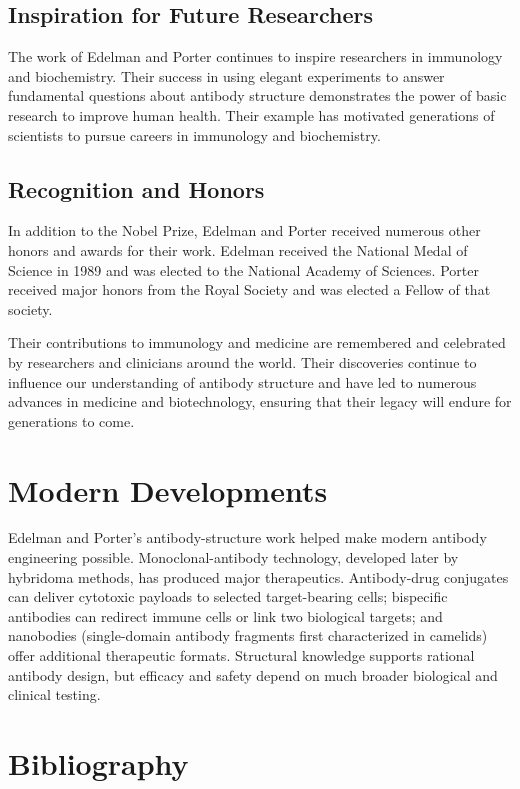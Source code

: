 \subsection{Inspiration for Future Researchers}

The work of Edelman and Porter continues to inspire researchers in immunology and biochemistry. Their success in using elegant experiments to answer fundamental questions about antibody structure demonstrates the power of basic research to improve human health. Their example has motivated generations of scientists to pursue careers in immunology and biochemistry.

\subsection{Recognition and Honors}

In addition to the Nobel Prize, Edelman and Porter received numerous other honors and awards for their work. Edelman received the National Medal of Science in 1989 and was elected to the National Academy of Sciences. Porter received major honors from the Royal Society and was elected a Fellow of that society.

Their contributions to immunology and medicine are remembered and celebrated by researchers and clinicians around the world. Their discoveries continue to influence our understanding of antibody structure and have led to numerous advances in medicine and biotechnology, ensuring that their legacy will endure for generations to come.


\section{Modern Developments}

Edelman and Porter's antibody-structure work helped make modern antibody engineering possible. Monoclonal-antibody technology, developed later by hybridoma methods, has produced major therapeutics. Antibody-drug conjugates can deliver cytotoxic payloads to selected target-bearing cells; bispecific antibodies can redirect immune cells or link two biological targets; and nanobodies (single-domain antibody fragments first characterized in camelids) offer additional therapeutic formats. Structural knowledge supports rational antibody design, but efficacy and safety depend on much broader biological and clinical testing.


\section{Bibliography}

